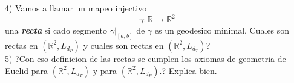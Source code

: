 \documentclass{amsart}
\numberwithin{equation}{section}
\theoremstyle{definition}
\theoremstyle{remark}
\begin{document}
4) Vamos a llamar un mapeo injectivo $$\gamma: \mathbb{R} ^{} \to \mathbb{R} ^{2} $$ una \textbf{\emph{recta}} si cado segmento $\gamma | _{[a,b]}$ de $\gamma$ es un geodesico minimal. Cuales son rectas en $(\mathbb{R} ^{2}, L _{d _{P}}) $
y cuales son rectas en $(\mathbb{R} ^{2}, L _{d _{T}}) $?
\\

5) ?Con eso definicion de las rectas se cumplen los axiomas de geometria de Euclid para $(\mathbb{R} ^{2}, L _{d _{T}}) $ y para $(\mathbb{R} ^{2}, L _{d _{P}}) $.? Explica bien.

\end{document}
